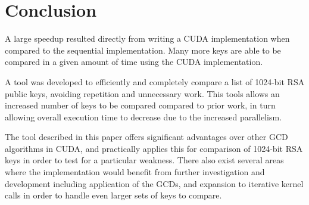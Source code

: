 \documentclass[10pt, conference]{./IEEEtran}
\begin{document}

\section{Conclusion}
A large speedup resulted directly from writing a CUDA 
implementation when compared to the sequential implementation. Many 
more keys are able to be compared in a given amount of time using the CUDA
implementation. 

A tool was developed to efficiently and completely compare a list of 1024-bit 
RSA public keys, avoiding repetition and unnecessary work. This 
tools allows an increased number of keys to be compared 
compared to prior work, in turn allowing overall execution time to decrease due 
to the increased parallelism.

The tool described in this paper offers significant advantages over other GCD 
algorithms in CUDA, and practically applies this for comparison of 1024-bit 
RSA keys in order to test for a particular weakness. There also exist 
several areas where the implementation would benefit from further 
investigation and development including application of the GCDs, and 
expansion to iterative kernel calls in order to handle even larger sets of 
keys to compare.
\end{document}
